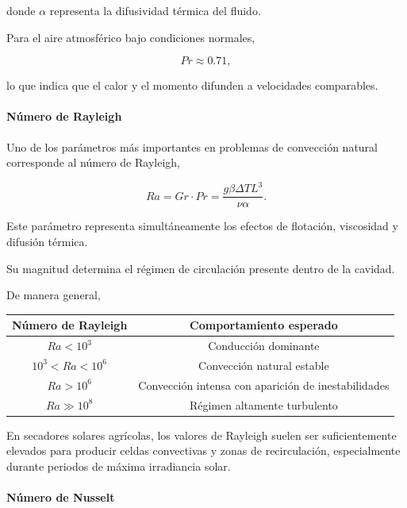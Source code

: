 donde $\alpha$ representa la difusividad térmica del fluido.

Para el aire atmosférico bajo condiciones normales,

\[
Pr\approx0.71,
\]

lo que indica que el calor y el momento difunden a velocidades comparables.


\paragraph{Número de Rayleigh}

Uno de los parámetros más importantes en problemas de convección natural corresponde al número de Rayleigh,

\begin{equation}
Ra=Gr\cdot Pr
=
\frac
{g\beta\Delta TL^3}
{\nu\alpha}.
\end{equation}

Este parámetro representa simultáneamente los efectos de flotación, viscosidad y difusión térmica.

Su magnitud determina el régimen de circulación presente dentro de la cavidad.

De manera general,

\begin{center}
\begin{tabular}{cc}
\toprule
Número de Rayleigh & Comportamiento esperado\\
\midrule
$Ra<10^3$ & Conducción dominante\\
$10^3<Ra<10^6$ & Convección natural estable\\
$Ra>10^6$ & Convección intensa con aparición de inestabilidades\\
$Ra\gg10^8$ & Régimen altamente turbulento\\
\bottomrule
\end{tabular}
\end{center}

En secadores solares agrícolas, los valores de Rayleigh suelen ser suficientemente elevados para producir celdas convectivas y zonas de recirculación, especialmente durante periodos de máxima irradiancia solar.


\paragraph{Número de Nusselt}

